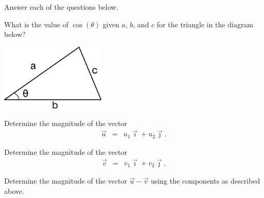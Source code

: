 
\begin{problem}
\item Answer each of the questions below.

  \begin{subproblem}
  \item What is the value of $\cos(\theta)$ given $a$, $b$, and $c$
    for the triangle in the diagram below?

    \includegraphics[width=5cm]{ink/week11/lawOfCosines}

  \item Determine the magnitude of the vector
    \begin{eqnarray*}
      \vec{u} & = & u_1 \vec{\imath} + u_2 \vec{\jmath}.
    \end{eqnarray*}

    \vfill

  \item Determine the magnitude of the vector
    \begin{eqnarray*}
      \vec{v} & = & v_1 \vec{\imath} + v_2 \vec{\jmath}.
    \end{eqnarray*}

    \vfill

  \item Determine the magnitude of the vector $\vec{u}-\vec{v}$ using
    the components as described above.

    \vfill

  \end{subproblem}

\end{problem}


